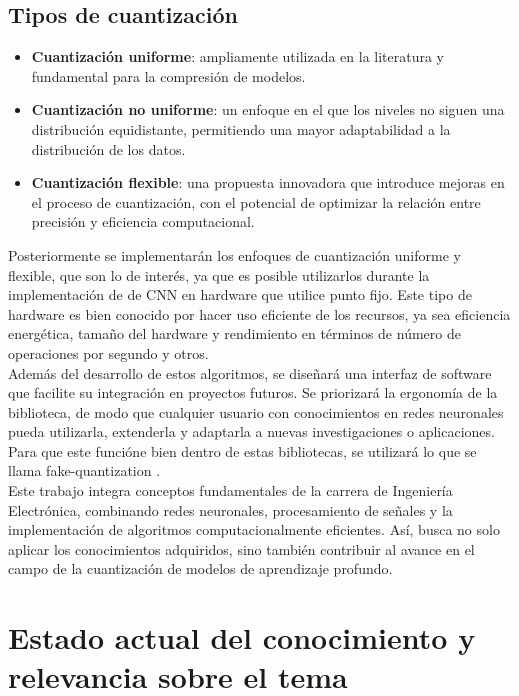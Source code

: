\documentclass[a4paper,11pt, oneside]{article}
\begin{document}
\subsection*{Tipos de cuantización}
\begin{itemize}
    \item \textbf{Cuantización uniforme}: ampliamente utilizada en la literatura y fundamental para la compresión de modelos. \cite{SAYOOD2018257}
    \item \textbf{Cuantización no uniforme}: un enfoque en el que los niveles no siguen una distribución equidistante, permitiendo una mayor adaptabilidad a la distribución de los datos. \cite{SAYOOD2018257}
    \item \textbf{Cuantización flexible}: una propuesta innovadora que introduce mejoras en el proceso de cuantización, con el potencial de optimizar la relación entre precisión y eficiencia computacional. \cite{electronics13101923}
\end{itemize}

Posteriormente se implementarán los enfoques de cuantización uniforme y flexible, que son lo de interés, ya que es posible utilizarlos durante la implementación de de CNN en hardware que utilice punto fijo. Este tipo de hardware es bien conocido por hacer uso eficiente de los recursos, ya sea eficiencia energética, tamaño del hardware y rendimiento en términos de número de operaciones por segundo y otros. \\

Además del desarrollo de estos algoritmos, se diseñará una interfaz de software que facilite su integración en proyectos futuros. Se priorizará la ergonomía de la biblioteca, de modo que cualquier usuario con conocimientos en redes neuronales pueda utilizarla, extenderla y adaptarla a nuevas investigaciones o aplicaciones. Para que este funcióne bien dentro de estas bibliotecas, se utilizará lo que se llama fake-quantization \cite{electronics13101923}. \\

Este trabajo integra conceptos fundamentales de la carrera de Ingeniería Electrónica, combinando redes neuronales, procesamiento de señales y la implementación de algoritmos computacionalmente eficientes. Así, busca no solo aplicar los conocimientos adquiridos, sino también contribuir al avance en el campo de la cuantización de modelos de aprendizaje profundo. \\

\section*{Estado actual del conocimiento y relevancia sobre el tema}
\end{document}
